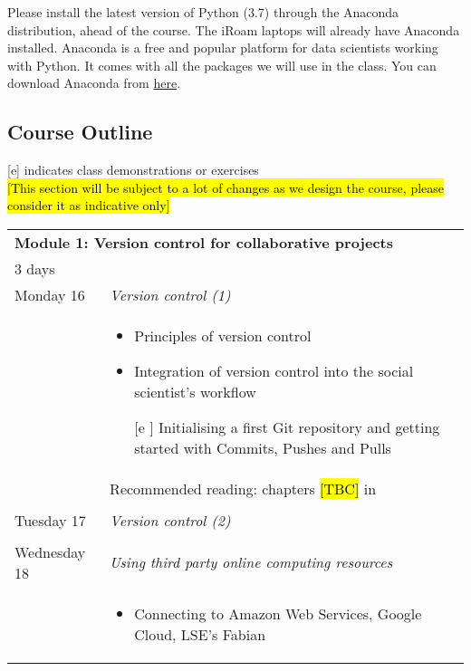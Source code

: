 \documentclass{amsart}
\theoremstyle{definition}
\theoremstyle{remark}
\numberwithin{equation}{section}
\begin{document}
Please install the latest version of Python (3.7) through the Anaconda distribution, ahead of the course. The iRoam laptops will already have Anaconda installed. Anaconda is a free and popular platform for data scientists working with Python. It comes with all the packages we will use in the class. You can download Anaconda from \href{https://www.anaconda.com/distribution/}{here}.

\subsection*{Course Outline}

[e] indicates class demonstrations or exercises\\

\hl{[This section will be subject to a lot of changes as we design the course, please consider it as indicative only]} \\

\begin{center}
    \begin{tabular}{| p{2.5cm} | p{12.5cm} |}
    \hline
    \multicolumn{2}{|l|}{\textbf{Module 1: Version control for collaborative projects}} \\
    \multicolumn{2}{|l|}{3 days} \\
    \hline
       Monday 16  & \textit{Version control (1)} \\
            & \begin{itemize}
                \item Principles of version control
                \item Integration of version control into the social scientist's workflow
                \item [[e]] Initialising a first Git repository and getting started with Commits, Pushes and Pulls
            \end{itemize}
            \\
            & Recommended reading: chapters \hl{[TBC]} in \cite{gentzkow2014code} \\
            & \\
       Tuesday 17  & \textit{Version control (2)} \\
            & \\
       Wednesday 18 & \textit{Using third party online computing resources} \\
            & \begin{itemize}
                \item Connecting to Amazon Web Services, Google Cloud, LSE's Fabian
            \end{itemize}
            \\
    \hline
    \end{tabular}
\end{center}
\end{document}
